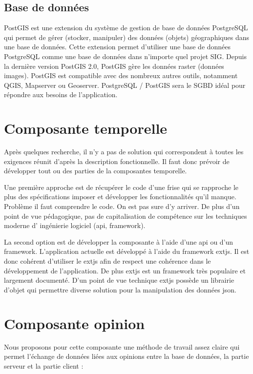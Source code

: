\subsection{Base de données}

PostGIS est une extension du système de gestion de base de données PostgreSQL qui permet de gérer (stocker, manipuler) des données (objets) géographiques dans une base de données. Cette extension permet d'utiliser une base de données PostgreSQL comme
une base de données dans n'importe quel projet SIG. Depuis la dernière version PostGIS 2.0, PostGIS gère les données raster (données images). PostGIS est compatible avec des nombreux autres outils, notamment QGIS, Mapserver ou Geoserver.
PostgreSQL / PostGIS sera le SGBD idéal pour répondre aux besoins de l'application.

\section{Composante temporelle}
Après quelques recherche, il n'y a pas de solution qui correspondent à toutes les exigences réunit d'après la description fonctionnelle. Il faut donc prévoir de développer tout ou des parties de la composantes temporelle.

Une première approche est de récupérer le code d'une frise qui se rapproche le plus des spécifications imposer et développer les fonctionnalités qu'il manque. Problème il faut comprendre le code. On est pas sure d'y arriver. De plus d'un point de vue pédagogique, pas de capitalisation de compétence sur les techniques moderne d' ingénierie logiciel (api, framework).

La second option est de développer la composante à l'aide d'une api ou d'un framework. L'application actuelle est développé à l'aide du framework extjs. Il est donc cohérent d'utiliser le extjs afin de respect une cohérence dans le développement de l'application. De plus extjs est un framework très populaire et largement documenté. D'un point de vue technique extjs possède un librairie d'objet qui permettre diverse solution pour la manipulation des données json.


\section{Composante opinion}

Nous  proposons pour cette composante une méthode de travail assez claire qui permet l’échange de données liées aux opinions entre la base de données, la partie serveur et la partie client : \\


